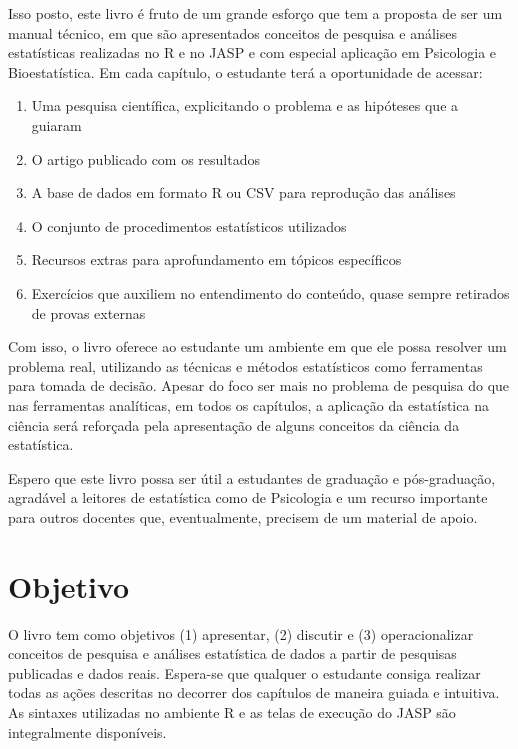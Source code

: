 \documentclass[
]{book}
\providecommand{\tightlist}{%
  \setlength{\itemsep}{0pt}\setlength{\parskip}{0pt}}
\begin{document}
Isso posto, este livro é fruto de um grande esforço que tem a proposta de ser um manual técnico, em que são apresentados conceitos de pesquisa e análises estatísticas realizadas no R e no JASP e com especial aplicação em Psicologia e Bioestatística. Em cada capítulo, o estudante terá a oportunidade de acessar:

\begin{enumerate}
\def\labelenumi{\arabic{enumi}.}
\tightlist
\item
  Uma pesquisa científica, explicitando o problema e as hipóteses que a guiaram\\
\item
  O artigo publicado com os resultados\\
\item
  A base de dados em formato R ou CSV para reprodução das análises\\
\item
  O conjunto de procedimentos estatísticos utilizados\\
\item
  Recursos extras para aprofundamento em tópicos específicos\\
\item
  Exercícios que auxiliem no entendimento do conteúdo, quase sempre retirados de provas externas
\end{enumerate}

Com isso, o livro oferece ao estudante um ambiente em que ele possa resolver um problema real, utilizando as técnicas e métodos estatísticos como ferramentas para tomada de decisão. Apesar do foco ser mais no problema de pesquisa do que nas ferramentas analíticas, em todos os capítulos, a aplicação da estatística na ciência será reforçada pela apresentação de alguns conceitos da ciência da estatística.

Espero que este livro possa ser útil a estudantes de graduação e pós-graduação, agradável a leitores de estatística como de Psicologia e um recurso importante para outros docentes que, eventualmente, precisem de um material de apoio.

\hypertarget{objetivo}{%
\section{Objetivo}\label{objetivo}}

O livro tem como objetivos (1) apresentar, (2) discutir e (3) operacionalizar conceitos de pesquisa e análises estatística de dados a partir de pesquisas publicadas e dados reais. Espera-se que qualquer o estudante consiga realizar todas as ações descritas no decorrer dos capítulos de maneira guiada e intuitiva. As sintaxes utilizadas no ambiente R e as telas de execução do JASP são integralmente disponíveis.
\end{document}
